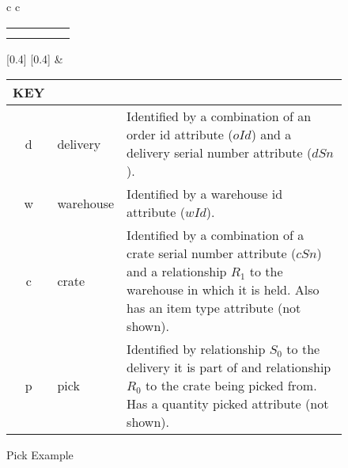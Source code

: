 \documentclass[10pt,a4paper]{article}
\begin{document}
\begin{figure} [H]
\begin{center}
\begin{tabular}{c c}
\begin{tabular}{cp{0.75cm}cp{0.75cm}c}
   \Rnode{d}{d}    & & \Rnode{w}{w}   & & \Rnode{v}{v}\\[1.2cm]     
	 \Rnode{p}{p}  & & \Rnode{c}{c} & &               
\end{tabular}
[0.4]
\idcomp
{}
[0.4]
\idcomp
{} 
\idcomp
{} 
\idcomp
{}
\idcomp
{}
\idcomp
{}
\idcomp
& \footnotesize
\begin{tabular}{c p{1.5cm} p{4cm}}
KEY && \\
\hline
d & delivery & Identified by a combination of an order id attribute ($oId$) and a
delivery serial number  attribute ($dSn$). \\
w & warehouse & Identified by a warehouse id attribute ($wId$). \\
c & crate & Identified by a combination of a crate serial number attribute ($cSn$) and a relationship $R_1$ to the warehouse in which it is held.
             Also has an item type attribute (not shown).\\
p & pick & Identified by relationship $S_0$ to the delivery  it is part of and relationship $R_0$ to the crate being picked from. Has a quantity picked attribute (not shown). \\
\end{tabular} 
\end{tabular}
\end{center}
\caption{Pick Example}
\label{pickexample}
\end{figure}
 
\end{document}

